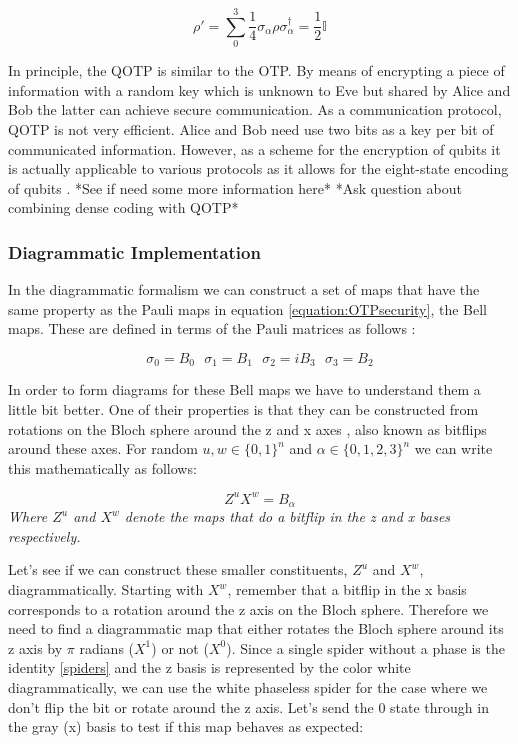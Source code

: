 \documentclass[]{article}
\begin{document}
\begin{equation}
	\label{equation:OTPsecurity}
	\rho' = \sum\limits_0^3 \frac{1}{4} \sigma_\alpha \rho \sigma_\alpha^\dagger = \frac{1}{2}\mathbb{I}
\end{equation}

In principle, the QOTP is similar to the OTP. By means of encrypting a piece of information with a random key which is unknown to Eve but shared by Alice and Bob the latter can achieve secure communication. As a communication protocol, QOTP is not very efficient. Alice and Bob need use two bits as a key per bit of communicated information. However, as a scheme for the encryption of qubits it is actually applicable to various protocols as it allows for the eight-state encoding of qubits \cite{DeVries2016}. *See if need some more information here* *Ask question about combining dense coding with QOTP*

\subsubsection{Diagrammatic Implementation}

In the diagrammatic formalism we can construct a set of maps that have the same property as the Pauli maps in equation \ref{equation:OTPsecurity}, the Bell maps. These are defined in terms of the Pauli matrices as follows \cite{Coecke2017}:

\begin{equation}
	\sigma_0 = B_0 ~~~ \sigma_1 = B_1 ~~~ \sigma_2 = iB_3 ~~~ \sigma_3 = B_2 
\end{equation}

In order to form diagrams for these Bell maps we have to understand them a little bit better. One of their properties is that they can be constructed from rotations on the Bloch sphere around the z and x axes \cite{DJORDJEVIC2012227}, also known as bitflips around these axes. For random $u, w \in \{0,1\}^n$ and $\alpha \in \{0,1,2,3\}^n$ we can write this mathematically as follows:

\begin{equation}
\label{randombell}
	Z^uX^w = B_\alpha
\end{equation}
\textit{Where $Z^u$ and $X^w$ denote the maps that do a bitflip in the z and x bases respectively.}

Let's see if we can construct these smaller constituents, $Z^u$ and $X^w$, diagrammatically. Starting with $X^w$, remember that a bitflip in the x basis corresponds to a rotation around the z axis on the Bloch sphere. Therefore we need to find a diagrammatic map that either rotates the Bloch sphere around its z axis by $\pi$ radians ($X^1$) or not ($X^0$). Since a single spider without a phase is the identity \ref{spiders} and the z basis is represented by the color white diagrammatically, we can use the white phaseless spider for the case where we don't flip the bit or rotate around the z axis. Let's send the 0 state through in the gray (x) basis to test if this map behaves as expected:
\end{document}
